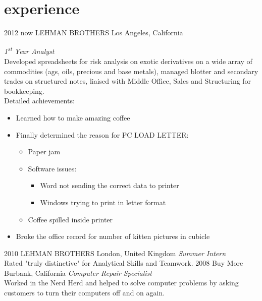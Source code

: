 \documentclass[]{k-cv} %
\begin{document}
\section{experience}

\begin{entrylist}
\entry
{2012 \to now}
{LEHMAN BROTHERS}
{Los Angeles, California}
{\emph{1\textsuperscript{st} Year Analyst} \\
Developed spreadsheets for risk analysis on exotic derivatives on a wide array 
of commodities (ags, oils, precious and base metals), managed blotter and 
secondary trades on structured notes, liaised with Middle Office, Sales and 
Structuring for bookkeeping. \\
Detailed achievements:
\begin{itemize}
\item Learned how to make amazing coffee
\item Finally determined the reason for \textsc{PC LOAD LETTER}:
\begin{itemize}
\item Paper jam
\item Software issues:
\begin{itemize}
\item Word not sending the correct data to printer
\item Windows trying to print in letter format
\end{itemize}
\item Coffee spilled inside printer
\end{itemize}
\item Broke the office record for number of kitten pictures in cubicle
\end{itemize}}
\entry
{2010 }
{LEHMAN BROTHERS}
{London, United Kingdom}
{\emph{Summer Intern} \\
Rated "truly distinctive" for Analytical Skills and Teamwork.}
\entry
{2008 }
{Buy More}
{Burbank, California}
{\emph{Computer Repair Specialist} \\
Worked in the Nerd Herd and helped to solve computer problems by asking 
customers to turn their computers off and on again.}
\end{entrylist}

\clearpage

\end{document}

